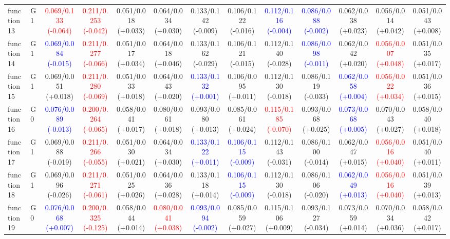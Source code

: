 \begin{table}[htbp]
\begin{adjustbox}{max width=\textwidth}
\begin{tabular}{llccccccccccc}
function13 & G1 & \textcolor{red}{0.069/0.133 (-0.064)} & \textcolor{red}{0.211/0.253 (-0.042)} & 0.051/0.018 (+0.033) & 0.064/0.034 (+0.030) & 0.133/0.142 (-0.009) & 0.106/0.122 (-0.016) & \textcolor{blue}{0.112/0.116 (-0.004)} & \textcolor{blue}{0.086/0.088 (-0.002)} & 0.062/0.038 (+0.023) & 0.056/0.014 (+0.042) & 0.051/0.043 (+0.008) \\
function14 & G1 & \textcolor{blue}{0.069/0.084 (-0.015)} & \textcolor{red}{0.211/0.277 (-0.066)} & 0.051/0.017 (+0.034) & 0.064/0.018 (+0.046) & 0.133/0.162 (-0.029) & 0.106/0.121 (-0.015) & 0.112/0.140 (-0.028) & \textcolor{blue}{0.086/0.098 (-0.011)} & 0.062/0.042 (+0.020) & \textcolor{red}{0.056/0.007 (+0.048)} & 0.051/0.035 (+0.017) \\
function15 & G1 & 0.069/0.051 (+0.018) & \textcolor{red}{0.211/0.280 (-0.069)} & 0.051/0.033 (+0.018) & 0.064/0.043 (+0.020) & \textcolor{blue}{0.133/0.132 (+0.001)} & 0.106/0.095 (+0.011) & 0.112/0.130 (-0.018) & 0.086/0.119 (-0.033) & \textcolor{blue}{0.062/0.058 (+0.004)} & \textcolor{red}{0.056/0.022 (+0.034)} & 0.051/0.036 (+0.015) \\
function16 & G0 & \textcolor{blue}{0.076/0.089 (-0.013)} & \textcolor{red}{0.200/0.264 (-0.065)} & 0.058/0.041 (+0.017) & 0.080/0.061 (+0.018) & 0.093/0.080 (+0.013) & 0.085/0.061 (+0.024) & \textcolor{red}{0.115/0.185 (-0.070)} & 0.093/0.068 (+0.025) & \textcolor{blue}{0.073/0.068 (+0.005)} & 0.070/0.043 (+0.027) & 0.058/0.040 (+0.018) \\
function17 & G1 & 0.069/0.088 (-0.019) & \textcolor{red}{0.211/0.266 (-0.055)} & 0.051/0.030 (+0.021) & 0.064/0.034 (+0.030) & \textcolor{blue}{0.133/0.122 (+0.011)} & \textcolor{blue}{0.106/0.115 (-0.009)} & 0.112/0.143 (-0.031) & 0.086/0.100 (-0.014) & 0.062/0.047 (+0.015) & \textcolor{red}{0.056/0.016 (+0.040)} & 0.051/0.040 (+0.011) \\
function18 & G1 & 0.069/0.096 (-0.026) & \textcolor{red}{0.211/0.271 (-0.061)} & 0.051/0.025 (+0.026) & 0.064/0.036 (+0.028) & 0.133/0.118 (+0.014) & \textcolor{blue}{0.106/0.115 (-0.009)} & 0.112/0.130 (-0.018) & 0.086/0.106 (-0.020) & \textcolor{blue}{0.062/0.049 (+0.013)} & \textcolor{red}{0.056/0.016 (+0.040)} & 0.051/0.039 (+0.013) \\
function19 & G0 & \textcolor{blue}{0.076/0.068 (+0.007)} & \textcolor{red}{0.200/0.325 (-0.125)} & 0.058/0.044 (+0.014) & \textcolor{red}{0.080/0.041 (+0.038)} & \textcolor{blue}{0.093/0.094 (-0.002)} & 0.085/0.059 (+0.027) & 0.115/0.106 (+0.009) & 0.093/0.127 (-0.034) & 0.073/0.059 (+0.014) & 0.070/0.034 (+0.036) & 0.058/0.042 (+0.017) \\

\end{tabular}
\end{adjustbox}
\end{table}
